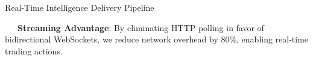 \documentclass{beamer}
\begin{document}
\begin{frame}{Real-Time Intelligence Delivery Pipeline}
\vspace{0.15cm}
\begin{tcolorbox}[enhanced, colback=primaryblue!4, colframe=primaryblue!30, boxrule=0.35pt,
  arc=3.5pt, width=0.98\textwidth, left=4pt, right=4pt, top=2.5pt, bottom=2.5pt, boxsep=0pt,
  halign=center, shadow={0.5pt}{-0.5pt}{0pt}{black!8}]
    \fontsize{5.5pt}{6.5pt}\selectfont
    \textcolor{primaryDark}{~~~\textbf{Streaming Advantage}: By eliminating HTTP polling in favor of bidirectional WebSockets, we reduce network overhead by 80\%, enabling real-time trading actions.}
\end{tcolorbox}
\end{frame}

\end{document}
